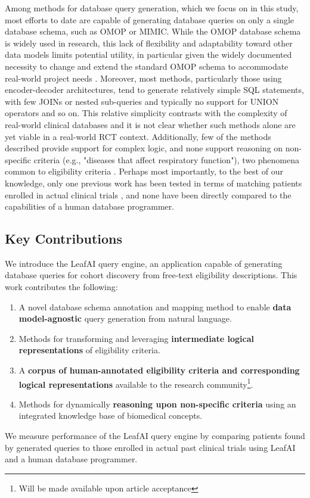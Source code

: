 \documentclass[../main.tex]{subfiles}
\begin{document}
Among methods for database query generation, which we focus on in this study, most efforts to date are capable of generating database queries on only a single database schema, such as OMOP or MIMIC. While the OMOP database schema is widely used in research, this lack of flexibility and adaptability toward other data models limits potential utility, in particular given the widely documented necessity to change and extend the standard OMOP schema to accommodate real-world project needs \cite{belenkaya2021extending, peng2021towards, zoch2021adaption, warner2019hemonc, zhou2013evaluation, shin2019genomic, kwon2019development}. Moreover, most methods, particularly those using encoder-decoder architectures, tend to generate relatively simple SQL statements, with few JOINs or nested sub-queries and typically no support for UNION operators and so on. This relative simplicity contrasts with the complexity of real-world clinical databases and it is not clear whether such methods alone are yet viable in a real-world RCT context. Additionally, few of the methods described provide support for complex logic, and none support reasoning on non-specific criteria (e.g., "diseases that affect respiratory function"), two phenomena common to eligibility criteria \cite{wang2017classifying, ross2010analysis}. Perhaps most importantly, to the best of our knowledge, only one previous work has been tested in terms of matching patients enrolled in actual clinical trials \cite{zhang2020deepenroll}, and none have been directly compared to the capabilities of a human database programmer.

\subsection*{Key Contributions}

We introduce the LeafAI query engine, an application capable of generating database queries for cohort discovery from free-text eligibility descriptions. This work contributes the following:

\begin{enumerate}
    \item{A novel database schema annotation and mapping method to enable \textbf{data model-agnostic} query generation from natural language.}
    \item{Methods for transforming and leveraging \textbf{intermediate logical representations} of eligibility criteria.}
    \item{A \textbf{corpus of human-annotated eligibility criteria and corresponding logical representations} available to the research community\footnote{Will be made available upon article acceptance}.}
    \item{Methods for dynamically \textbf{reasoning upon non-specific criteria} using an integrated knowledge base of biomedical concepts.}
\end{enumerate}

We measure performance of the LeafAI query engine by comparing patients found by generated queries to those enrolled in actual past clinical trials using LeafAI and a human database programmer.
\end{document}
